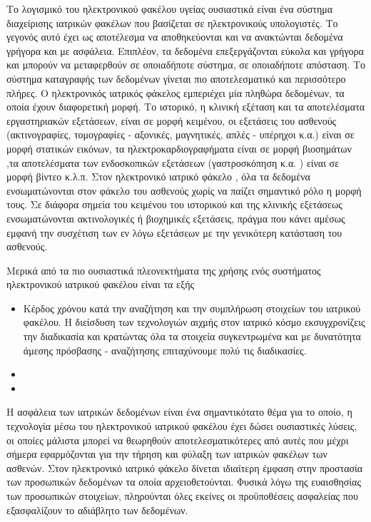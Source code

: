 Το λογισμικό του ηλεκτρονικού φακέλου υγείας ουσιαστικά είναι ένα σύστημα διαχείρισης ιατρικών φακέλων που βασίζεται σε ηλεκτρονικούς υπολογιστές. Το γεγονός αυτό έχει ως αποτέλεσμα να αποθηκεύονται και να ανακτώνται δεδομένα γρήγορα και με ασφάλεια. Επιπλέον, τα δεδομένα επεξεργάζονται εύκολα και γρήγορα και μπορούν να μεταφερθούν σε οποιαδήποτε σύστημα, σε οποιαδήποτε απόσταση. Το σύστημα καταγραφής των δεδομένων γίνεται πιο αποτελεσματικό και περισσότερο πλήρες. Ο ηλεκτρονικός ιατρικός φάκελος εμπεριέχει μία πληθώρα δεδομένων, τα οποία έχουν διαφορετική μορφή. Το ιστορικό, η κλινική εξέταση και τα αποτελέσματα εργαστηριακών εξετάσεων, είναι σε μορφή κειμένου, οι εξετάσεις του ασθενούς (ακτινογραφίες, τομογραφίες - αξονικές, μαγνητικές, απλές - υπέρηχοι κ.α.) είναι σε μορφή στατικών εικόνων, τα ηλεκτροκαρδιογραφήματα είναι σε μορφή βιοσημάτων ,τα αποτελέσματα των ενδοσκοπικών εξετάσεων (γαστροσκόπηση κ.α. ) είναι σε μορφή βίντεο κ.λ.π.  Στον ηλεκτρονικό ιατρικό φάκελο , όλα τα δεδομένα ενσωματώνονται στον φάκελο του ασθενούς χωρίς να παίζει σημαντικό ρόλο η μορφή τους. Σε διάφορα σημεία του κειμένου του ιστορικού και της κλινικής εξετάσεως ενσωματώνονται ακτινολογικές ή βιοχημικές εξετάσεις, πράγμα που κάνει αμέσως εμφανή την συσχέτιση των εν λόγω εξετάσεων με την γενικότερη κατάσταση του ασθενούς.

Μερικά από τα πιο ουσιαστικά πλεονεκτήματα της χρήσης ενός συστήματος ηλεκτρονικού ιατρικού φακέλου είναι τα εξής
\begin{itemize}

\item Κέρδος χρόνου κατά την αναζήτηση και την συμπλήρωση στοιχείων του ιατρικού φακέλου. Η διείσδυση των τεχνολογιών αιχμής στον ιατρικό κόσμο εκσυγχρονίζεις την διαδικασία και κρατώντας όλα τα στοιχεία συγκεντρωμένα και με δυνατότητα άμεσης πρόσβασης - αναζήτησης επιταχύνουμε πολύ τις διαδικασίες.


\item

\item


\end{itemize}



Η ασφάλεια των ιατρικών δεδομένων είναι ένα σημαντικότατο θέμα για το οποίο, η
τεχνολογία μέσω του ηλεκτρονικού ιατρικού φακέλου έχει δώσει ουσιαστικές λύσεις, οι οποίες
μάλιστα μπορεί να θεωρηθούν αποτελεσματικότερες από αυτές που μέχρι σήμερα εφαρμόζονται
για την τήρηση και φύλαξη των ιατρικών φακέλων των ασθενών.
Στον ηλεκτρονικό ιατρικό φάκελο δίνεται ιδιαίτερη έμφαση στην προστασία των
προσωπικών δεδομένων τα οποία αρχειοθετούνται. Φυσικά λόγω της ευαισθησίας των
προσωπικών στοιχείων, πληρούνται όλες εκείνες οι προϋποθέσεις ασφαλείας που εξασφαλίζουν
το αδιάβλητο των δεδομένων. 


